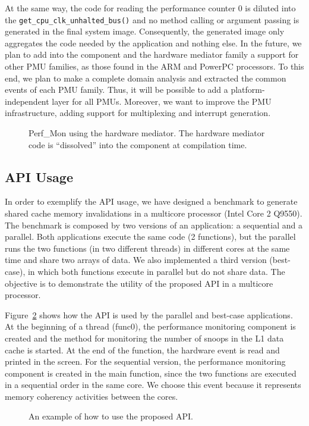 \documentclass[conference]{IEEEtran}
\newcommand{\prg}[3][ht!]{
\begin{figure}[#1]
  
  \caption{#3}
  \label{prg:#2}
\end{figure}
}
\begin{document}
At the same way, the code for reading the performance counter 0 is diluted into the \texttt{get\_cpu\_clk\_unhalted\_bus()} and no method calling or argument passing is generated in the final system image. Consequently, the generated image only aggregates the code needed by the application and nothing else. In the future, we plan to add into the component and the hardware mediator family a support for other PMU families, as those found in the ARM and PowerPC processors. To this end, we plan to make a complete domain analysis and extracted the common events of each PMU family. Thus, it will be possible to add a platform-independent layer for all PMUs. Moreover, we want to improve the PMU infrastructure, adding support for multiplexing and interrupt generation.

\prg{perfmon}{Perf\_Mon using the hardware mediator. The hardware mediator code is ``dissolved'' into the component at compilation time.}

\subsection{API Usage}
\label{sec:api_usage}

In order to exemplify the API usage, we have designed a benchmark to generate shared cache memory invalidations in a multicore processor (Intel Core 2 Q9550). The benchmark is composed by two versions of an application: a sequential and a parallel. Both applications execute the same code (2 functions), but the parallel runs the two functions (in two different threads) in different cores at the same time and share two arrays of data. We also implemented a third version (best-case), in which both functions execute in parallel but do not share data. The objective is to demonstrate the utility of the proposed API in a multicore processor.  

Figure~\ref{prg:api_example} shows how the API is used by the parallel and best-case applications. At the beginning of a thread (func0), the performance monitoring component is created and the method for monitoring the number of snoops in the L1 data cache is started. At the end of the function, the hardware event is read and printed in the screen. For the sequential version, the performance monitoring component is created in the main function, since the two functions are executed in a sequential order in the same core. We choose this event because it represents memory coherency activities between the cores.

\prg{api_example}{An example of how to use the proposed API.}
\end{document}
